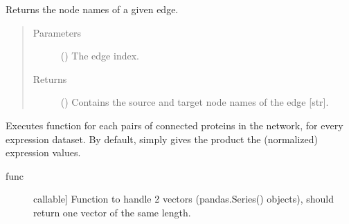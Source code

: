 \documentclass[letterpaper,10pt,english]{sphinxmanual}
\begin{document}
\begin{fulllineitems}

\begin{fulllineitems}
\label{\detokenize{main:pypath.main.PyPath.edge_names}}
Returns the node names of a given edge.
\begin{quote}\begin{description}
\item[{Parameters}] \leavevmode
{} () \textendash{} The edge index.

\item[{Returns}] \leavevmode
() \textendash{} Contains the source and target node names of
the edge {[}str{]}.

\end{description}\end{quote}

\end{fulllineitems}


\begin{fulllineitems}
\label{\detokenize{main:pypath.main.PyPath.edges_3d}}
\end{fulllineitems}


\begin{fulllineitems}
\label{\detokenize{main:pypath.main.PyPath.edges_expression}}
Executes function  for each pairs of connected proteins in the
network, for every expression dataset. By default,  simply
gives the product the (normalized) expression values.
\begin{description}
\item[{func}] \leavevmode{[}callable{]}
Function to handle 2 vectors (pandas.Series() objects), should
return one vector of the same length.

\end{description}


\end{fulllineitems}
\end{fulllineitems}
\end{document}
